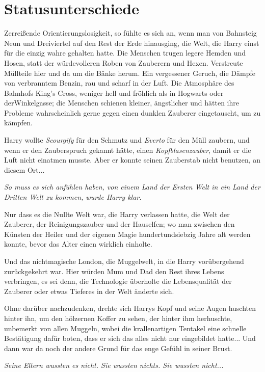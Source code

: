 \chapter{Statusunterschiede}

Zerreißende Orientierungslosigkeit, so fühlte es sich an, wenn man von Bahnsteig
Neun und Dreiviertel auf den Rest der Erde hinausging, die Welt, die Harry einst
für die einzig wahre gehalten hatte. Die Menschen trugen legere Hemden und
Hosen, statt der würdevolleren Roben von Zauberern und Hexen. Verstreute
Müllteile hier und da um die Bänke herum. Ein vergessener Geruch, die Dämpfe von
verbranntem Benzin, rau und scharf in der Luft. Die Atmosphäre des Bahnhofs
King's Cross, weniger hell und fröhlich als in Hogwarts oder derWinkelgasse; die
Menschen schienen kleiner, ängstlicher und hätten ihre Probleme wahrscheinlich
gerne gegen einen dunklen Zauberer eingetauscht, um zu kämpfen.

Harry wollte \glqq{}\emph{Scourgify}\grqq{} für den Schmutz und \glqq{}
\emph{Everto}\grqq{} für den Müll zaubern, und wenn er den Zauberspruch gekannt
hätte, einen \glqq{}\emph{Kopfblasenzauber}\grqq{}, damit er die Luft nicht
einatmen musste. Aber er konnte seinen Zauberstab nicht benutzen, an diesem
Ort...

\emph{So muss es sich anfühlen haben, von einem Land der Ersten Welt in ein
Land der Dritten Welt zu kommen, wurde Harry klar.}

Nur dass es die Nullte Welt war, die Harry verlassen hatte, die Welt der
Zauberer, der Reinigungszauber und der Hauselfen; wo man zwischen den Künsten
der Heiler und der eigenen Magie hundertundsiebzig Jahre alt werden konnte,
bevor das Alter einen wirklich einholte.

Und das nichtmagische London, die Muggelwelt, in die Harry vorübergehend
zurückgekehrt war. Hier würden Mum und Dad den Rest ihres Lebens verbringen, es
sei denn, die Technologie überholte die Lebensqualität der Zauberer oder etwas
Tieferes in der Welt änderte sich.

Ohne darüber nachzudenken, drehte sich Harrys Kopf und seine Augen huschten
hinter ihn, um den hölzernen Koffer zu sehen, der hinter ihm herhuschte,
unbemerkt von allen Muggeln, wobei die krallenartigen Tentakel eine schnelle
Bestätigung dafür boten, dass er sich das alles nicht nur eingebildet hatte...
Und dann war da noch der andere Grund für das enge Gefühl in seiner Brust.

\emph{Seine Eltern wussten es nicht. Sie wussten nichts. Sie wussten nicht...}

